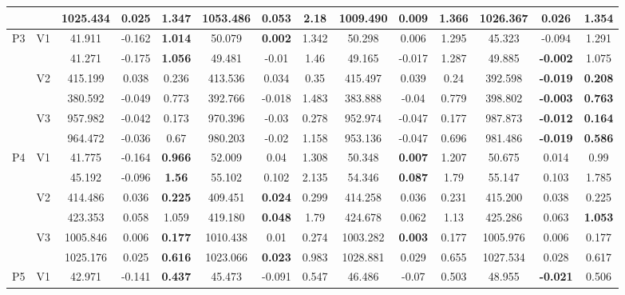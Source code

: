 \documentclass[12pt,a4paper]{article}
\begin{document}
\begin{sidewaystable}[ht]
{\begin{tabular}{cc|ccc|ccc|ccc|ccc|}
   &  & 1025.434 & 0.025 & \textbf{1.347} & 1053.486 & 0.053 & 2.18 & 1009.490 & \textbf{0.009} & 1.366 & 1026.367 & 0.026 & 1.354 \\ 
   \hline \hline\multirow{6}{*}{P3} & \multirow{2}{*}{V1} & 41.911 & -0.162 & \textbf{1.014} & 50.079 & \textbf{0.002} & 1.342 & 50.298 & 0.006 & 1.295 & 45.323 & -0.094 & 1.291 \\ 
   &  & 41.271 & -0.175 & \textbf{1.056} & 49.481 & -0.01 & 1.46 & 49.165 & -0.017 & 1.287 & 49.885 & \textbf{-0.002} & 1.075 \\ 
   & \multirow{2}{*}{V2} & 415.199 & 0.038 & 0.236 & 413.536 & 0.034 & 0.35 & 415.497 & 0.039 & 0.24 & 392.598 & \textbf{-0.019} & \textbf{0.208} \\ 
   &  & 380.592 & -0.049 & 0.773 & 392.766 & -0.018 & 1.483 & 383.888 & -0.04 & 0.779 & 398.802 & \textbf{-0.003} & \textbf{0.763} \\ 
   & \multirow{2}{*}{V3} & 957.982 & -0.042 & 0.173 & 970.396 & -0.03 & 0.278 & 952.974 & -0.047 & 0.177 & 987.873 & \textbf{-0.012} & \textbf{0.164} \\ 
   &  & 964.472 & -0.036 & 0.67 & 980.203 & -0.02 & 1.158 & 953.136 & -0.047 & 0.696 & 981.486 & \textbf{-0.019} & \textbf{0.586} \\ 
   \hline \hline\multirow{6}{*}{P4} & \multirow{2}{*}{V1} & 41.775 & -0.164 & \textbf{0.966} & 52.009 & 0.04 & 1.308 & 50.348 & \textbf{0.007} & 1.207 & 50.675 & 0.014 & 0.99 \\ 
   &  & 45.192 & -0.096 & \textbf{1.56} & 55.102 & 0.102 & 2.135 & 54.346 & \textbf{0.087} & 1.79 & 55.147 & 0.103 & 1.785 \\ 
   & \multirow{2}{*}{V2} & 414.486 & 0.036 & \textbf{0.225} & 409.451 & \textbf{0.024} & 0.299 & 414.258 & 0.036 & 0.231 & 415.200 & 0.038 & 0.225 \\ 
   &  & 423.353 & 0.058 & 1.059 & 419.180 & \textbf{0.048} & 1.79 & 424.678 & 0.062 & 1.13 & 425.286 & 0.063 & \textbf{1.053} \\ 
   & \multirow{2}{*}{V3} & 1005.846 & 0.006 & \textbf{0.177} & 1010.438 & 0.01 & 0.274 & 1003.282 & \textbf{0.003} & 0.177 & 1005.976 & 0.006 & 0.177 \\ 
   &  & 1025.176 & 0.025 & \textbf{0.616} & 1023.066 & \textbf{0.023} & 0.983 & 1028.881 & 0.029 & 0.655 & 1027.534 & 0.028 & 0.617 \\ 
   \hline \hline\multirow{6}{*}{P5} & \multirow{2}{*}{V1} & 42.971 & -0.141 & \textbf{0.437} & 45.473 & -0.091 & 0.547 & 46.486 & -0.07 & 0.503 & 48.955 & \textbf{-0.021} & 0.506 \\ 

\end{tabular}}
\end{sidewaystable}
\end{document}

